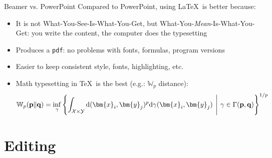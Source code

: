 \documentclass[10pt,aspectratio=169]{beamer}
\begin{document}
\begin{frame}{Beamer vs. PowerPoint}
Compared to PowerPoint, using \LaTeX\ is better because:
\begin{itemize}
\item It is not What-You-See-Is-What-You-Get, but
What-You-\emph{Mean}-Is-What-You-Get:
you write the content, the computer does the typesetting
\item Produces a \texttt{pdf}: no problems with fonts, formulas,
      program versions
\item Easier to keep consistent style, fonts, highlighting, etc.
\item Math typesetting in \TeX\ is the best (e.g.: $\mathbb{W}_p$ distance):
\begin{equation}
    \mathbb{W}_{p}(\mathbf{p}\|\mathbf{q}) = \inf_{\gamma}\left\{ \int_{\mathcal{X}\times\mathcal{Y}}
    {\mathrm{d}(\bm{x}_i,\bm{y}_j)^{p}\mathrm{d}\gamma(\bm{x}_i,\bm{y}_j)}
    \mathrel{\left. \vphantom{\sum_{}} \middle\vert \right.} 
    \gamma\in\Gamma(\mathbf{p},\mathbf{q})\right\}^{1/p}
\end{equation}
\end{itemize}

\end{frame}

\section{Editing}

\end{document}
